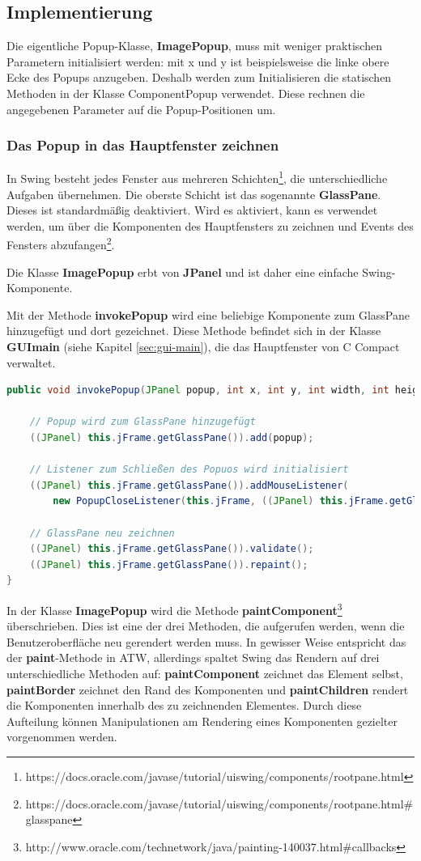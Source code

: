 \subsection{Implementierung}
Die eigentliche Popup-Klasse, \textbf{ImagePopup}, muss mit weniger praktischen Parametern initialisiert werden: mit x und y ist beispielsweise die linke obere Ecke des Popups anzugeben. Deshalb werden zum Initialisieren die statischen Methoden in der Klasse ComponentPopup verwendet. Diese rechnen die angegebenen Parameter auf die Popup-Positionen um.

\subsubsection*{Das Popup in das Hauptfenster zeichnen}
In Swing besteht jedes Fenster aus mehreren Schichten\footnote{https://docs.oracle.com/javase/tutorial/uiswing/components/rootpane.html}, die unterschiedliche Aufgaben übernehmen. Die oberste Schicht ist das sogenannte \textbf{GlassPane}. Dieses ist standardmäßig deaktiviert. Wird es aktiviert, kann es verwendet werden, um über die Komponenten des Hauptfensters zu zeichnen und Events des Fensters abzufangen\footnote{https://docs.oracle.com/javase/tutorial/uiswing/components/rootpane.html\#glasspane}.

Die Klasse \textbf{ImagePopup} erbt von \textbf{JPanel} und ist daher eine einfache Swing-Komponente. 

Mit der Methode \textbf{invokePopup} wird eine beliebige Komponente zum GlassPane hinzugefügt und dort gezeichnet. Diese Methode befindet sich in der Klasse \textbf{GUImain} (siehe Kapitel \ref{sec:gui-main}), die das Hauptfenster von C Compact verwaltet.
\begin{lstlisting}[language=JAVA]
public void invokePopup(JPanel popup, int x, int y, int width, int height) {

	// Popup wird zum GlassPane hinzugefügt
	((JPanel) this.jFrame.getGlassPane()).add(popup);
	
	// Listener zum Schließen des Popuos wird initialisiert
	((JPanel) this.jFrame.getGlassPane()).addMouseListener(
		new PopupCloseListener(this.jFrame, ((JPanel) this.jFrame.getGlassPane()), popup, x, y, width, height));
		
	// GlassPane neu zeichnen
	((JPanel) this.jFrame.getGlassPane()).validate();
	((JPanel) this.jFrame.getGlassPane()).repaint();
}
\end{lstlisting}

In der Klasse \textbf{ImagePopup} wird die Methode \textbf{paintComponent}\footnote{http://www.oracle.com/technetwork/java/painting-140037.html\#callbacks} überschrieben. Dies ist eine der drei Methoden, die aufgerufen werden, wenn die Benutzeroberfläche neu gerendert werden muss. In gewisser Weise entspricht das der \textbf{paint}-Methode in ATW, allerdings spaltet Swing das Rendern auf drei unterschiedliche Methoden auf: \textbf{paintComponent} zeichnet das Element selbst, \textbf{paintBorder} zeichnet den Rand des Komponenten und \textbf{paintChildren} rendert die Komponenten innerhalb des zu zeichnenden Elementes. Durch diese Aufteilung können Manipulationen am Rendering eines Komponenten gezielter vorgenommen werden.

